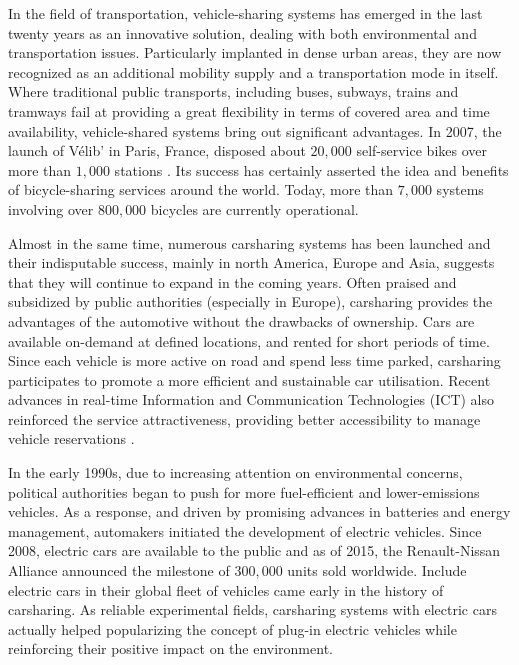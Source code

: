 \medskip
In the field of transportation, vehicle-sharing systems has emerged in the last twenty years as an innovative solution, dealing with both environmental and transportation issues.
Particularly implanted in dense urban areas, they are now recognized as an additional mobility supply and a transportation mode in itself.
Where traditional public transports, including buses, subways, trains and tramways fail at providing a great  flexibility in terms of covered area and time availability, vehicle-shared systems bring out significant advantages.
In 2007, the launch of V{\'e}lib' in Paris, France, disposed about $20,000$ self-service bikes over more than $1,000$ stations \cite{laporte_shared_2015}.
Its success has certainly asserted the idea and benefits of bicycle-sharing services around the world.
Today, more than $7,000$ systems involving over $800,000$ bicycles are currently operational.

Almost in the same time, numerous carsharing systems has been launched and their indisputable success, mainly in north America, Europe and Asia, suggests that they will continue to expand in the coming years.
Often praised and subsidized by public authorities (especially in Europe), carsharing provides the advantages of the automotive without the drawbacks of ownership.
Cars are available on-demand at defined locations, and rented for short periods of time.
Since each vehicle is more active on road and spend less time parked, carsharing participates to promote a more efficient and sustainable car utilisation.
Recent advances in real-time Information and Communication Technologies (ICT) also reinforced the service attractiveness, providing better accessibility to manage vehicle reservations \cite{jorge_carsharing_2013}.


In the early 1990s, due to increasing attention on environmental concerns, political authorities began to push for more fuel-efficient and lower-emissions vehicles.
As a response, and driven by promising advances in batteries and energy management, automakers initiated the development of electric vehicles.
Since 2008, electric cars are available to the public and as of 2015, the Renault-Nissan Alliance announced the milestone of $300,000$ units sold worldwide.
Include electric cars in their global fleet of vehicles came early in the history of carsharing.
As reliable experimental fields, carsharing systems with electric cars actually helped popularizing the concept of plug-in electric vehicles while reinforcing their positive impact on the environment.


